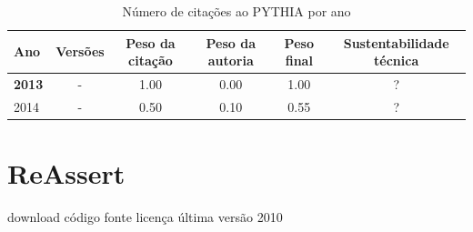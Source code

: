 \begin{table}[H]
\caption{Número de citações ao PYTHIA por ano}
\centering
\begin{tabular}{| l | c | c | c | c | c |}
  \hline
  Ano & Versões & Peso da citação & Peso da autoria & Peso final & Sustentabilidade técnica \\
  \hline
            {\bf 2013}
          &
          -
          &
          1.00
          &
          0.00
          &
            {\color{blue} 1.00}
          &
          ?
          \\
\hline
            2014
          &
          -
          &
          0.50
          &
          0.10
          &
            {\color{blue} 0.55}
          &
          ?
          \\
\hline
\end{tabular}
\end{table}



\section{ReAssert}
\checkmark download
\checkmark código fonte
\checkmark licença
\checkmark última versão 2010



